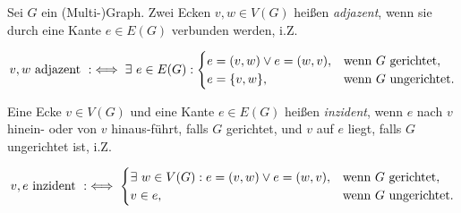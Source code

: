         \begin{definition} \label{def:adjacent_incident}

            Sei $G$ ein (Multi-)Graph.
            Zwei Ecken $v, w \in V(G)$ heißen \textit{adjazent}, wenn sie durch eine Kante $e \in E(G)$ verbunden werden, i.Z.

            \begin{align*}
                v, w ~\text{adjazent}~
                :\iff
                \exists ~ e \in E(G):
                    \begin{cases}
                        e = (v, w) \lor e = (w, v), & \text{wenn} ~ G ~ \text{gerichtet},   \\
                        e = {\left \{ v, w \right \}},         & \text{wenn} ~ G ~ \text{ungerichtet}. \\
                    \end{cases}
            \end{align*}

            Eine Ecke $v \in V(G)$ und eine Kante $e \in E(G)$ heißen \textit{inzident}, wenn $e$ nach $v$ hinein- oder von $v$ hinaus-führt, falls $G$ gerichtet, und $v$ auf $e$ liegt, falls $G$ ungerichtet ist, i.Z.

            \begin{align*}
                v, e ~\text{inzident}~
                :\iff
                \begin{cases}
                    \exists ~ w \in V(G): e = (v, w) \lor e = (w, v), & \text{wenn} ~ G ~ \text{gerichtet},   \\
                    v \in e,                                        & \text{wenn} ~ G ~ \text{ungerichtet}. \\
                \end{cases}
            \end{align*}

        \end{definition}

